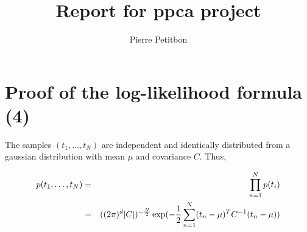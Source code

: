 \documentclass{article}
\title{Report for ppca project}
\author{Pierre Petitbon}
\DeclarePairedDelimiter{\abs}{\lvert}{\rvert}
\begin{document}
\maketitle

\section{Proof of the log-likelihood formula (4)}

The samples $(t_{1}, \ldots, t_{N})$ are independent and identically distributed from a gaussian distribution with mean $\mu$ and covariance $C$. Thus,

\begin{eqnarray*}
p(t_{1}, \ldots, t_{N}) & = & \prod_{n=1}^N p(t_{i}) \\
& = & ((2\pi)^d \abs{C})^{-\frac{N}{2}} \exp(-\frac{1}{2} \sum_{n=1}^N (t_{n}-\mu)^T C^{-1} (t_n-\mu)) \\
\end{eqnarray*}
\end{document}
